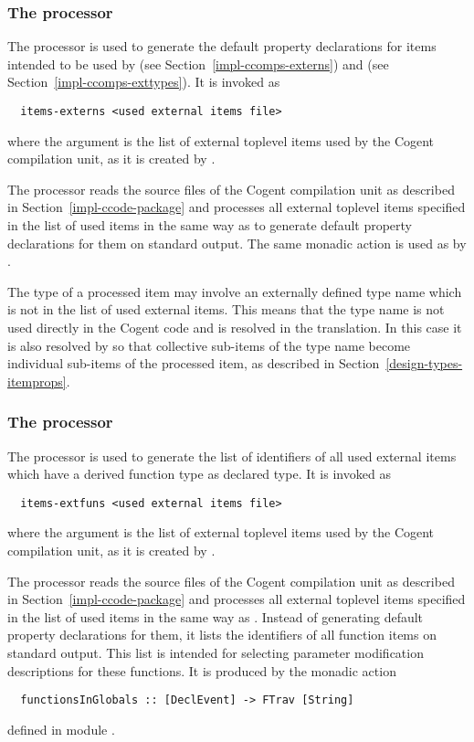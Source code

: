 \subsubsection{The processor }

The processor  is used to generate the default property declarations for items intended
to be used by  (see Section~\ref{impl-ccomps-externs}) and  
(see Section~\ref{impl-ccomps-exttypes}). It is invoked as
\begin{verbatim}
  items-externs <used external items file>
\end{verbatim}
where the argument is the list of external toplevel items used by the Cogent compilation unit, as it is created 
by .

The processor reads the source files of the Cogent compilation unit as described in Section~\ref{impl-ccode-package}
and processes all external toplevel items specified in the list of used items in the same way as 
to generate default property declarations for them on standard output. The same monadic action 
is used as by .

The type of a processed item may involve an externally defined type name which is not in the list of used external items.
This means that the type name is not used directly in the Cogent code and is resolved in the translation. In this case it is 
also resolved by  so that collective sub-items of the type name become individual sub-items of 
the processed item, as described in Section~\ref{design-types-itemprops}.

\subsubsection{The processor }

The processor  is used to generate the list of identifiers of all used external items which 
have a derived function type as declared type. It is invoked as
\begin{verbatim}
  items-extfuns <used external items file>
\end{verbatim}
where the argument is the list of external toplevel items used by the Cogent compilation unit, as it is created 
by .

The processor reads the source files of the Cogent compilation unit as described in Section~\ref{impl-ccode-package}
and processes all external toplevel items specified in the list of used items in the same way as .
Instead of generating default property declarations for them, it lists the identifiers of all function items on 
standard output. This list is intended for selecting parameter modification descriptions for these functions. It
is produced by the monadic action
\begin{verbatim}
  functionsInGlobals :: [DeclEvent] -> FTrav [String]
\end{verbatim}
defined in module .

